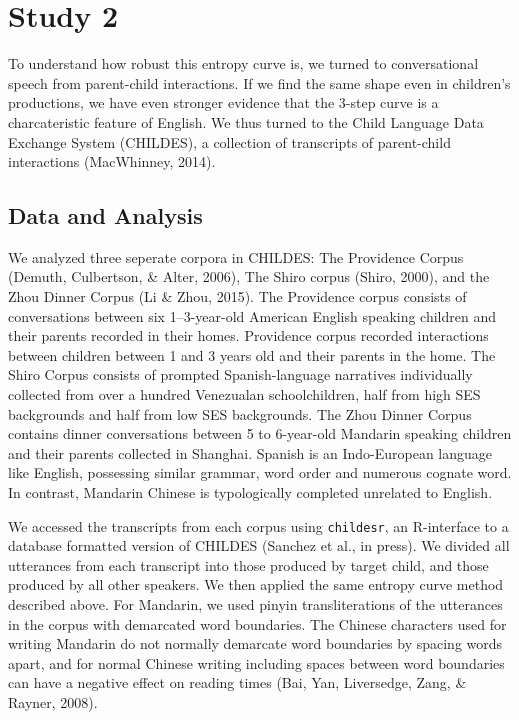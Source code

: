 \documentclass[10pt, letterpaper]{article}
\begin{document}
\hypertarget{study-2}{%
\section{Study 2}\label{study-2}}

To understand how robust this entropy curve is, we turned to
conversational speech from parent-child interactions. If we find the
same shape even in children's productions, we have even stronger
evidence that the 3-step curve is a charcateristic feature of English.
We thus turned to the Child Language Data Exchange System (CHILDES), a
collection of transcripts of parent-child interactions (MacWhinney,
2014).

\hypertarget{data-and-analysis-1}{%
\subsection{Data and Analysis}\label{data-and-analysis-1}}

We analyzed three seperate corpora in CHILDES: The Providence Corpus
(Demuth, Culbertson, \& Alter, 2006), The Shiro corpus (Shiro, 2000),
and the Zhou Dinner Corpus (Li \& Zhou, 2015). The Providence corpus
consists of conversations between six 1--3-year-old American English
speaking children and their parents recorded in their homes. Providence
corpus recorded interactions between children between 1 and 3 years old
and their parents in the home. The Shiro Corpus consists of prompted
Spanish-language narratives individually collected from over a hundred
Venezualan schoolchildren, half from high SES backgrounds and half from
low SES backgrounds. The Zhou Dinner Corpus contains dinner
conversations between 5 to 6-year-old Mandarin speaking children and
their parents collected in Shanghai. Spanish is an Indo-European
language like English, possessing similar grammar, word order and
numerous cognate word. In contrast, Mandarin Chinese is typologically
completed unrelated to English.

We accessed the transcripts from each corpus using \texttt{childesr}, an
R-interface to a database formatted version of CHILDES (Sanchez et al.,
in press). We divided all utterances from each transcript into those
produced by target child, and those produced by all other speakers. We
then applied the same entropy curve method described above. For
Mandarin, we used pinyin transliterations of the utterances in the
corpus with demarcated word boundaries. The Chinese characters used for
writing Mandarin do not normally demarcate word boundaries by spacing
words apart, and for normal Chinese writing including spaces between
word boundaries can have a negative effect on reading times (Bai, Yan,
Liversedge, Zang, \& Rayner, 2008).
\end{document}
